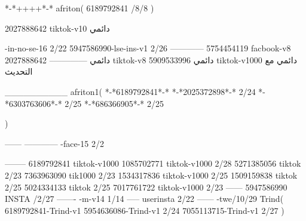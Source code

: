 *-*++++*-*
afriton(
6189792841 /8/8
)

2027888642 tiktok-v10
دائمي

-in-no-se-16 2/22
5947586990-lse-ins-v1 2/26
------------
5754454119 facbook-v8
دائمي
--------------
2027888642 tiktok-v8
دائمي
5909533996 tiktok-v1000
دائمي مع التحديث

__________
afriton1(
*-*6189792841*-*
*-*2025372898*-* 2/24
*-*6303763606*-* 2/25
*-*686366905*-* 2/25

)


------
------------
-face-15 2/2

--------
6189792841 tiktok-v1000
1085702771 tiktok-v1000 2/28
5271385056 tiktok 2/23
7363963090 tik1000 2/23
1534317836 tiktok-v1000 2/25
1509159838 tiktok 2/25
5024334133 tiktok 2/25
7017761722 tiktok-v1000 2/23
------
5947586990 INSTA /2/27
-------
-m-v14 1/14
-----
userinsta 2/22
------
-twe/10/29
Trind(
6189792841-Trind-v1 
5954636086-Trind-v1 2/24
7055113715-Trind-v1 2/27
)
